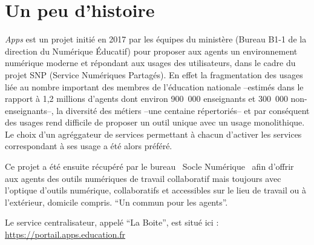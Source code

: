 \chapter*{Un peu d'histoire}

\emph{Apps} est un projet initié en 2017 par les équipes du ministère (Bureau B1-1 de la direction du Numérique Éducatif) pour proposer aux agents un environnement numérique  moderne et répondant aux usages des utilisateurs, dans le cadre du projet SNP (Service Numériques Partagés). 
En effet la fragmentation des usages liée au nombre important des membres de l'éducation nationale --estimés dans le rapport à 1,2 millions d'agents dont environ 900~000 enseignants et 300~000 non-enseignants--, la diversité des métiers --une centaine répertoriés-- et par conséquent des usages rend difficile de proposer un outil unique avec un usage monolithique. 
Le choix d'un agréggateur de services permettant à chacun d'activer les services correspondant à ses usage a été alors préféré.

Ce projet a été ensuite récupéré par le bureau \og~Socle Numérique~\fg{} afin d'offrir aux agents des outils numériques de travail collaboratif mais toujours avec l'optique d'outils numérique, collaboratifs et accessibles sur le lieu de travail ou à l'extérieur, domicile compris. ``Un commun pour les agents''.

Le service centralisateur, appelé ``La Boite'',  est situé ici : \url{https://portail.apps.education.fr}

